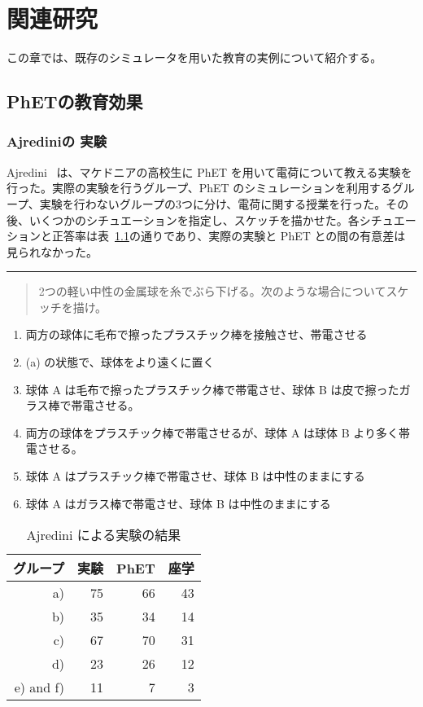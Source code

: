 \chapter{関連研究} \label{related}

この章では、既存のシミュレータを用いた教育の実例について紹介する。

\section{PhETの教育効果}

\subsection*{Ajrediniの 実験} \label{ajredini}

Ajredini~\cite{ajredini_real_2014} は、マケドニアの高校生に PhET を用いて電荷について教える実験を行った。実際の実験を行うグループ、PhET のシミュレーションを利用するグループ、実験を行わないグループの3つに分け、電荷に関する授業を行った。その後、いくつかのシチュエーションを指定し、スケッチを描かせた。各シチュエーションと正答率は表~\ref{ajredini_result}の通りであり、実際の実験と PhET との間の有意差は見られなかった。

\begin{table}[htb]
\noindent\rule{\linewidth}{0.4pt}
\begin{quote}
2つの軽い中性の金属球を糸でぶら下げる。次のような場合についてスケッチを描け。
\end{quote}
\begin{enumerate}
\renewcommand{\labelenumi}{\alph{enumi}).}
\item 両方の球体に毛布で擦ったプラスチック棒を接触させ、帯電させる
\item (a) の状態で、球体をより遠くに置く
\item 球体 A は毛布で擦ったプラスチック棒で帯電させ、球体 B は皮で擦ったガラス棒で帯電させる。
\item 両方の球体をプラスチック棒で帯電させるが、球体 A は球体 B より多く帯電させる。
\item 球体 A はプラスチック棒で帯電させ、球体 B は中性のままにする
\item 球体 A はガラス棒で帯電させ、球体 B は中性のままにする
\end{enumerate}
\centering
\begin{tabular}{rrrr}
  \toprule
  グループ & 実験 & PhET & 座学 \\
  \midrule
  a) & 75 & 66 & 43 \\
  b) & 35 & 34 & 14 \\
  c) & 67 & 70 & 31 \\
  d) & 23 & 26 & 12 \\
  e) and f) & 11 & 7 & 3 \\
  \bottomrule
\end{tabular}
\caption{Ajredini による実験の結果} \label{ajredini_result}
\end{table}


